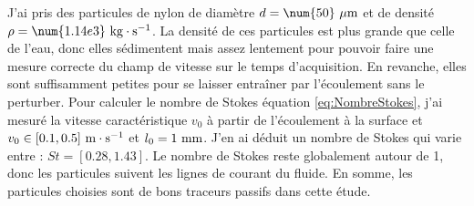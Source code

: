\documentclass[french, 10pt]{article}
\begin{document}
J'ai pris des particules de nylon de diamètre $d=\num{50}\rm~ \mu m$ et de densité $\rho = \num{1.14e3}~\rm kg\cdot s^{-1}$. La densité de ces particules est plus grande que celle de l'eau, donc elles sédimentent mais assez lentement pour pouvoir faire une mesure correcte du champ de vitesse sur le temps d'acquisition. En revanche, elles sont suffisamment petites pour se laisser entraîner par l'écoulement sans le perturber. Pour calculer le nombre de Stokes équation \eqref{eq:NombreStokes}, j'ai mesuré la vitesse caractéristique $v_0$ à partir de l'écoulement à la surface et $v_0 \in [0.1, 0.5]~\rm m\cdot s^{-1}$ et $l_0 = 1\rm~  mm$. J'en ai déduit un nombre de Stokes qui varie entre : $St = [0.28, 1.43]$. Le nombre de Stokes reste globalement autour de 1, donc les particules suivent les lignes de courant du fluide. En somme, les particules choisies sont de bons traceurs passifs dans cette étude.



%   
\end{document}
